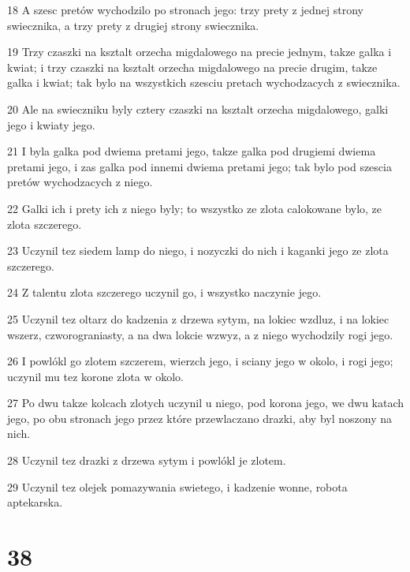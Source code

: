 \par 18 A szesc pretów wychodzilo po stronach jego: trzy prety z jednej strony swiecznika, a trzy prety z drugiej strony swiecznika.
\par 19 Trzy czaszki na ksztalt orzecha migdalowego na precie jednym, takze galka i kwiat; i trzy czaszki na ksztalt orzecha migdalowego na precie drugim, takze galka i kwiat; tak bylo na wszystkich szesciu pretach wychodzacych z swiecznika.
\par 20 Ale na swieczniku byly cztery czaszki na ksztalt orzecha migdalowego, galki jego i kwiaty jego.
\par 21 I byla galka pod dwiema pretami jego, takze galka pod drugiemi dwiema pretami jego, i zas galka pod innemi dwiema pretami jego; tak bylo pod szescia pretów wychodzacych z niego.
\par 22 Galki ich i prety ich z niego byly; to wszystko ze zlota calokowane bylo, ze zlota szczerego.
\par 23 Uczynil tez siedem lamp do niego, i nozyczki do nich i kaganki jego ze zlota szczerego.
\par 24 Z talentu zlota szczerego uczynil go, i wszystko naczynie jego.
\par 25 Uczynil tez oltarz do kadzenia z drzewa sytym, na lokiec wzdluz, i na lokiec wszerz, czworograniasty, a na dwa lokcie wzwyz, a z niego wychodzily rogi jego.
\par 26 I powlókl go zlotem szczerem, wierzch jego, i sciany jego w okolo, i rogi jego; uczynil mu tez korone zlota w okolo.
\par 27 Po dwu takze kolcach zlotych uczynil u niego, pod korona jego, we dwu katach jego, po obu stronach jego przez które przewlaczano drazki, aby byl noszony na nich.
\par 28 Uczynil tez drazki z drzewa sytym i powlókl je zlotem.
\par 29 Uczynil tez olejek pomazywania swietego, i kadzenie wonne, robota aptekarska.

\chapter{38}

